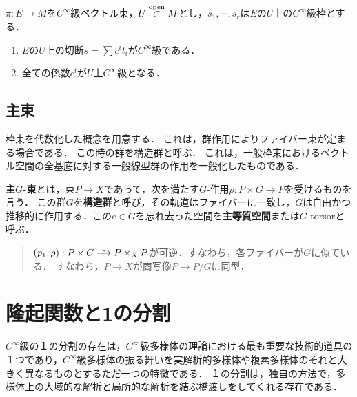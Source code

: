 \documentclass[uplatex,dvipdfmx]{jsreport}
\begin{document}
\begin{proposition}
    $\pi:E\to M$を$C^\infty$級ベクトル束，$U\overset{\mathrm{open}}{\subset} M$とし，$s_1,\cdots,s_r$は$E$の$U$上の$C^\infty$級枠とする．
    \begin{enumerate}
        \item $E$の$U$上の切断$s=\sum c^it_i$が$C^\infty$級である．
        \item 全ての係数$c^i$が$U$上$C^\infty$級となる．
    \end{enumerate}
\end{proposition}

\subsection{主束}

\begin{tcolorbox}[colframe=ForestGreen, colback=ForestGreen!10!white,breakable,colbacktitle=ForestGreen!40!white,coltitle=black,fonttitle=\bfseries\sffamily,
title=]
    枠束を代数化した概念を用意する．
    これは，群作用によりファイバー束が定まる場合である．
    この時の群を構造群と呼ぶ．
    これは，一般枠束におけるベクトル空間の全基底に対する一般線型群の作用を一般化したものである．
\end{tcolorbox}

\begin{definition}
    \textbf{主$G$-束}とは，束$P\to X$であって，次を満たす$G$-作用$\rho:P\times G\to P$を受けるものを言う．
    この群$G$を\textbf{構造群}と呼び，その軌道はファイバーに一致し，$G$は自由かつ推移的に作用する．この$e\in G$を忘れ去った空間を\textbf{主等質空間}または$G$-torsorと呼ぶ．
    \begin{quote}
        $(p_1,\rho):P\times G\iso P\times_XP$が可逆．すなわち，各ファイバーが$G$に似ている．
        すなわち，$P\to X$が商写像$P\to P/G$に同型．
    \end{quote}
\end{definition}

\section{隆起関数と1の分割}

\begin{tcolorbox}[colframe=ForestGreen, colback=ForestGreen!10!white,breakable,colbacktitle=ForestGreen!40!white,coltitle=black,fonttitle=\bfseries\sffamily,
title=]
    $C^\infty$級の１の分割の存在は，$C^\infty$級多様体の理論における最も重要な技術的道具の１つであり，$C^\infty$級多様体の振る舞いを実解析的多様体や複素多様体のそれと大きく異なるものとするただ一つの特徴である．
    １の分割は，独自の方法で，多様体上の大域的な解析と局所的な解析を結ぶ橋渡しをしてくれる存在である．
\end{tcolorbox}
\end{document}
